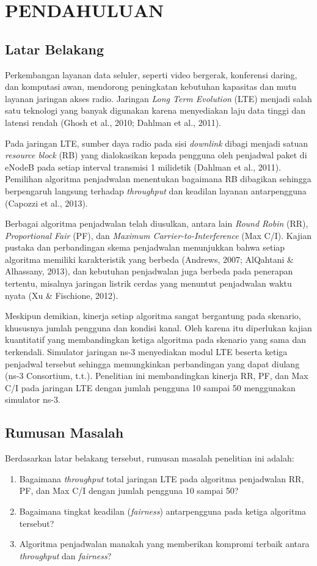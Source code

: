 \chapter{PENDAHULUAN}

\section{Latar Belakang}
Perkembangan layanan data seluler, seperti video bergerak, konferensi daring, dan komputasi awan, mendorong peningkatan kebutuhan kapasitas dan mutu layanan jaringan akses radio. Jaringan \textit{Long Term Evolution} (LTE) menjadi salah satu teknologi yang banyak digunakan karena menyediakan laju data tinggi dan latensi rendah (Ghosh et al., 2010; Dahlman et al., 2011).

Pada jaringan LTE, sumber daya radio pada sisi \textit{downlink} dibagi menjadi satuan \textit{resource block} (RB) yang dialokasikan kepada pengguna oleh penjadwal paket di eNodeB pada setiap interval transmisi 1 milidetik (Dahlman et al., 2011). Pemilihan algoritma penjadwalan menentukan bagaimana RB dibagikan sehingga berpengaruh langsung terhadap \textit{throughput} dan keadilan layanan antarpengguna (Capozzi et al., 2013).

Berbagai algoritma penjadwalan telah diusulkan, antara lain \textit{Round Robin} (RR), \textit{Proportional Fair} (PF), dan \textit{Maximum Carrier-to-Interference} (Max C/I). Kajian pustaka dan perbandingan skema penjadwalan menunjukkan bahwa setiap algoritma memiliki karakteristik yang berbeda (Andrews, 2007; AlQahtani \& Alhassany, 2013), dan kebutuhan penjadwalan juga berbeda pada penerapan tertentu, misalnya jaringan listrik cerdas yang menuntut penjadwalan waktu nyata (Xu \& Fischione, 2012).

Meskipun demikian, kinerja setiap algoritma sangat bergantung pada skenario, khususnya jumlah pengguna dan kondisi kanal. Oleh karena itu diperlukan kajian kuantitatif yang membandingkan ketiga algoritma pada skenario yang sama dan terkendali. Simulator jaringan ns-3 menyediakan modul LTE beserta ketiga penjadwal tersebut sehingga memungkinkan perbandingan yang dapat diulang (ns-3 Consortium, t.t.). Penelitian ini membandingkan kinerja RR, PF, dan Max C/I pada jaringan LTE dengan jumlah pengguna 10 sampai 50 menggunakan simulator ns-3.

\section{Rumusan Masalah}
Berdasarkan latar belakang tersebut, rumusan masalah penelitian ini adalah:
\begin{enumerate}
\item Bagaimana \textit{throughput} total jaringan LTE pada algoritma penjadwalan RR, PF, dan Max C/I dengan jumlah pengguna 10 sampai 50?
\item Bagaimana tingkat keadilan (\textit{fairness}) antarpengguna pada ketiga algoritma tersebut?
\item Algoritma penjadwalan manakah yang memberikan kompromi terbaik antara \textit{throughput} dan \textit{fairness}?
\end{enumerate}

